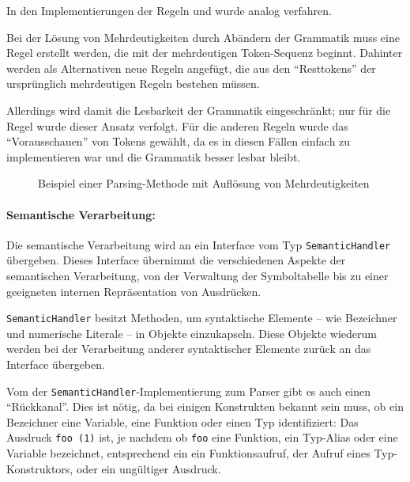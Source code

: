 \documentclass[twoside,a4paper,fleqn,12pt]{article}
\begin{document}
In den Implementierungen der Regeln  und  wurde analog verfahren.

Bei der Lösung von Mehrdeutigkeiten durch Abändern der Grammatik muss eine Regel erstellt werden,
die mit der mehrdeutigen Token-Sequenz beginnt. Dahinter werden als Alternativen neue Regeln angefügt,
die aus den "`Resttokens"' der ursprünglich mehrdeutigen Regeln bestehen müssen. %

Allerdings wird damit die Lesbarkeit der Grammatik eingeschränkt; nur für die Regel  wurde dieser Ansatz verfolgt.
Für die anderen Regeln wurde das "`Vorausschauen"' von Tokens gewählt, da es in diesen Fällen einfach zu implementieren war
und die Grammatik besser lesbar bleibt.

\begin{figure}[h]
   \centering
  
  \caption{Beispiel einer Parsing-Methode mit Auflösung von Mehrdeutigkeiten}
  \label{fig:ParseProgramStatements}
\end{figure}

\paragraph{Semantische Verarbeitung:}
Die semantische Verarbeitung wird an ein Interface vom Typ \verb+SemanticHandler+ übergeben.
Dieses Interface übernimmt die verschiedenen Aspekte der semantischen Verarbeitung, von der Verwaltung der
Symboltabelle bis zu einer geeigneten internen Repräsentation von Ausdrücken.

\verb+SemanticHandler+ besitzt Methoden, um syntaktische Elemente -- wie Bezeichner und numerische Literale -- in Objekte 
einzukapseln. Diese Objekte wiederum werden bei der Verarbeitung anderer syntaktischer Elemente
zurück an das Interface übergeben. %


Vom der \verb+SemanticHandler+-Implementierung zum Parser gibt es auch einen "`Rückkanal"'. Dies ist nötig, da bei einigen
Konstrukten bekannt sein muss, ob ein Bezeichner eine Variable, eine Funktion oder einen Typ identifiziert:
Das Ausdruck \verb+foo (1)+ ist, je nachdem ob \verb+foo+ eine Funktion, ein Typ-Alias oder eine Variable bezeichnet,
entsprechend ein ein Funktionsaufruf, der Aufruf eines Typ-Konstruktors, oder ein ungültiger Ausdruck.
\end{document}
